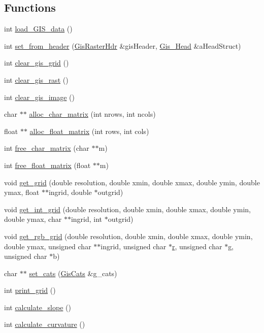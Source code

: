 \subsection*{Functions}
\begin{CompactItemize}
\item 
int \hyperlink{GisApi_8C_a7}{load\_\-GIS\_\-data} ()
\item 
int \hyperlink{GisApi_8C_a8}{set\_\-from\_\-header} (\hyperlink{classGisRasterHdr}{Gis\-Raster\-Hdr} \&gis\-Header, \hyperlink{structGis__Head}{Gis\_\-Head} \&a\-Head\-Struct)
\item 
int \hyperlink{GisApi_8C_a9}{clear\_\-gis\_\-grid} ()
\item 
int \hyperlink{GisApi_8C_a10}{clear\_\-gis\_\-rast} ()
\item 
int \hyperlink{GisApi_8C_a11}{clear\_\-gis\_\-image} ()
\item 
char $\ast$$\ast$ \hyperlink{GisApi_8C_a12}{alloc\_\-char\_\-matrix} (int nrows, int ncols)
\item 
float $\ast$$\ast$ \hyperlink{GisApi_8C_a13}{alloc\_\-float\_\-matrix} (int rows, int cols)
\item 
int \hyperlink{GisApi_8C_a14}{free\_\-char\_\-matrix} (char $\ast$$\ast$m)
\item 
int \hyperlink{GisApi_8C_a15}{free\_\-float\_\-matrix} (float $\ast$$\ast$m)
\item 
void \hyperlink{GisApi_8C_a16}{get\_\-grid} (double resolution, double xmin, double xmax, double ymin, double ymax, float $\ast$$\ast$ingrid, double $\ast$outgrid)
\item 
void \hyperlink{GisApi_8C_a17}{get\_\-int\_\-grid} (double resolution, double xmin, double xmax, double ymin, double ymax, char $\ast$$\ast$ingrid, int $\ast$outgrid)
\item 
void \hyperlink{GisApi_8C_a18}{get\_\-rgb\_\-grid} (double resolution, double xmin, double xmax, double ymin, double ymax, unsigned char $\ast$$\ast$ingrid, unsigned char $\ast$\hyperlink{hdfdefs_8h_a25}{r}, unsigned char $\ast$g, unsigned char $\ast$b)
\item 
char $\ast$$\ast$ \hyperlink{GisApi_8C_a19}{set\_\-cats} (\hyperlink{classGisCats}{Gis\-Cats} \&g\_\-cats)
\item 
int \hyperlink{GisApi_8C_a20}{print\_\-grid} ()
\item 
int \hyperlink{GisApi_8C_a21}{calculate\_\-slope} ()
\item 
int \hyperlink{GisApi_8C_a22}{calculate\_\-curvature} ()
\item 

\end{CompactItemize}
